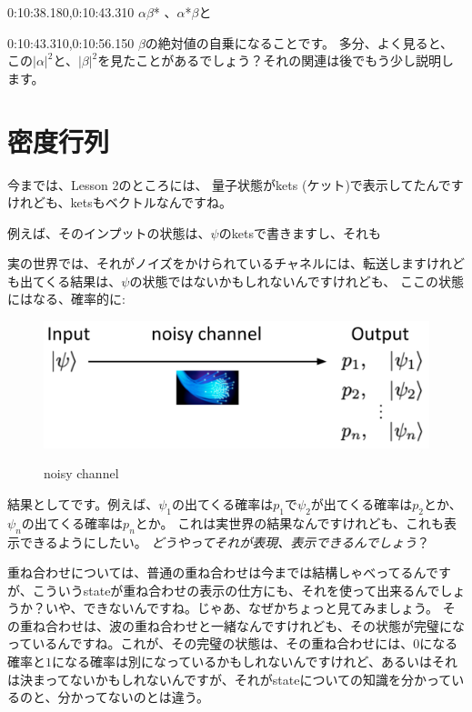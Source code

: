 0:10:38.180,0:10:43.310
$\alpha$$\beta$* 、$\alpha$*$\beta$と

0:10:43.310,0:10:56.150
$\beta$の絶対値の自乗になることです。
\fi
多分、よく見ると、この$|\alpha|^2$と、$|\beta|^2$を見たことがあるでしょう？それの関連は後でもう少し説明します。


\section{密度行列}
今までは、Lesson 2のところには、
量子状態がkets (ケット)で表示してたんですけれども、ketsもベクトルなんですね。

例えば、そのインプットの状態は、$\psi$のketsで書きますし、それも

実の世界では、それがノイズをかけられているチャネルには、転送しますけれども出てくる結果は、$\psi$の状態ではないかもしれないんですけれども、
ここの状態にはなる、確率的に:
\begin{figure}[H]
    \centering
    \includegraphics[width=1.0\textwidth]{lesson3/noisy_channel.pdf}
    \label{fig: 1}
    \begin{center}
        \caption{noisy channel}
    \end{center}
\end{figure}
結果としてです。例えば、$\psi_1$の出てくる確率は$p_1$で$\psi_2$が出てくる確率は$p_2$とか、
$\psi_n$の出てくる確率は$p_n$とか。
これは実世界の結果なんですけれども、これも表示できるようにしたい。
\textit{どうやってそれが表現、表示できるんでしょう}？

重ね合わせについては、普通の重ね合わせは今までは結構しゃべってるんですが、こういうstateが重ね合わせの表示の仕方にも、それを使って出来るんでしょうか？いや、できないんですね。じゃあ、なぜかちょっと見てみましょう。
その重ね合わせは、波の重ね合わせと一緒なんですけれども、その状態が完璧になっているんですね。これが、その完璧の状態は、その重ね合わせには、$0$になる確率と$1$になる確率は別になっているかもしれないんですけれど、あるいはそれは決まってないかもしれないんですが、それがstateについての知識を分かっているのと、分かってないのとは違う。

